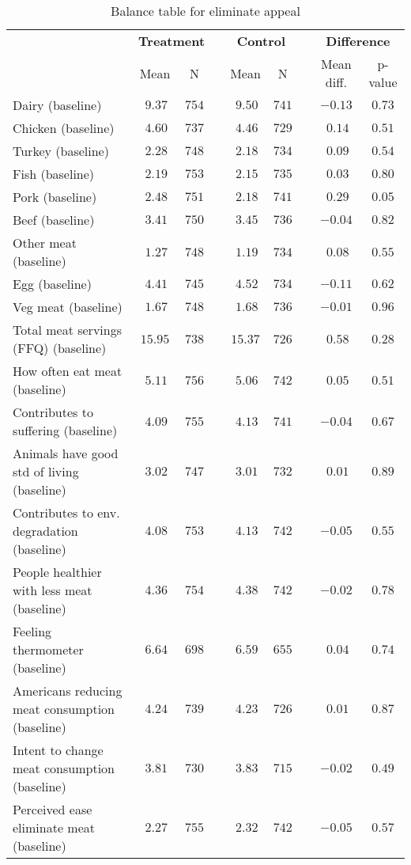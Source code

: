 \begin{table*}[ht]
\caption{Balance table for eliminate appeal\label{dataframe}} 
\begin{center}
\begin{tabular}{lcccccccc}
\hline\hline
\multicolumn{1}{l}{\bfseries }&\multicolumn{2}{c}{\bfseries Treatment}&\multicolumn{1}{c}{\bfseries }&\multicolumn{2}{c}{\bfseries Control}&\multicolumn{1}{c}{\bfseries }&\multicolumn{2}{c}{\bfseries Difference}\tabularnewline
\cline{2-3} \cline{5-6} \cline{8-9}
\multicolumn{1}{l}{}&\multicolumn{1}{c}{Mean}&\multicolumn{1}{c}{N}&\multicolumn{1}{c}{}&\multicolumn{1}{c}{Mean}&\multicolumn{1}{c}{N}&\multicolumn{1}{c}{}&\multicolumn{1}{c}{Mean diff.}&\multicolumn{1}{c}{p-value}\tabularnewline
\hline
Dairy (baseline)&$~9.37$&$754$&&$~9.50$&$741$&&$-0.13$&$0.73$\tabularnewline
Chicken (baseline)&$~4.60$&$737$&&$~4.46$&$729$&&$~0.14$&$0.51$\tabularnewline
Turkey (baseline)&$~2.28$&$748$&&$~2.18$&$734$&&$~0.09$&$0.54$\tabularnewline
Fish (baseline)&$~2.19$&$753$&&$~2.15$&$735$&&$~0.03$&$0.80$\tabularnewline
Pork (baseline)&$~2.48$&$751$&&$~2.18$&$741$&&$~0.29$&$0.05$\tabularnewline
Beef (baseline)&$~3.41$&$750$&&$~3.45$&$736$&&$-0.04$&$0.82$\tabularnewline
Other meat (baseline)&$~1.27$&$748$&&$~1.19$&$734$&&$~0.08$&$0.55$\tabularnewline
Egg (baseline)&$~4.41$&$745$&&$~4.52$&$734$&&$-0.11$&$0.62$\tabularnewline
Veg meat (baseline)&$~1.67$&$748$&&$~1.68$&$736$&&$-0.01$&$0.96$\tabularnewline
Total meat servings (FFQ) (baseline)&$15.95$&$738$&&$15.37$&$726$&&$~0.58$&$0.28$\tabularnewline
How often eat meat (baseline)&$~5.11$&$756$&&$~5.06$&$742$&&$~0.05$&$0.51$\tabularnewline
Contributes to suffering (baseline)&$~4.09$&$755$&&$~4.13$&$741$&&$-0.04$&$0.67$\tabularnewline
Animals have good std of living (baseline)&$~3.02$&$747$&&$~3.01$&$732$&&$~0.01$&$0.89$\tabularnewline
Contributes to env. degradation (baseline)&$~4.08$&$753$&&$~4.13$&$742$&&$-0.05$&$0.55$\tabularnewline
People healthier with less meat (baseline)&$~4.36$&$754$&&$~4.38$&$742$&&$-0.02$&$0.78$\tabularnewline
Feeling thermometer (baseline)&$~6.64$&$698$&&$~6.59$&$655$&&$~0.04$&$0.74$\tabularnewline
Americans reducing meat consumption (baseline)&$~4.24$&$739$&&$~4.23$&$726$&&$~0.01$&$0.87$\tabularnewline
Intent to change meat consumption (baseline)&$~3.81$&$730$&&$~3.83$&$715$&&$-0.02$&$0.49$\tabularnewline
Perceived ease eliminate meat (baseline)&$~2.27$&$755$&&$~2.32$&$742$&&$-0.05$&$0.57$\tabularnewline

\end{tabular}
\end{center}
\end{table*}
